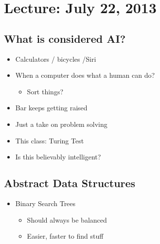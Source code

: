 
\section{Lecture: July 22, 2013}

\subsection{What is considered AI?}

\begin{itemize}
  \item Calculators / bicycles /Siri
  \item When a computer does what a human can do?
        \begin{itemize}
          \item Sort things?
        \end{itemize}
  \item Bar keeps getting raised
  \item Just a take on problem solving 
  \item This class: Turing Test
  \item Is this believably intelligent?
\end{itemize}

\subsection{Abstract Data Structures}

\begin{itemize}
  \item Binary Search Trees
        \begin{itemize}
          \item Should always be balanced
	   \item Easier, faster to find stuff
        \end{itemize}
\end{itemize}